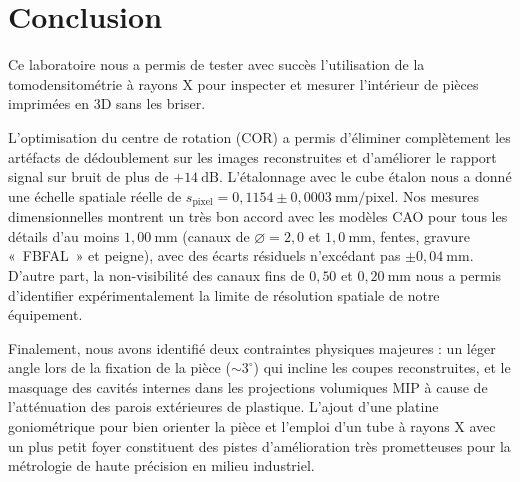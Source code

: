 \section{Conclusion}
\label{sec:conclusion}

Ce laboratoire nous a permis de tester avec succès l'utilisation de la tomodensitométrie à rayons X pour inspecter et mesurer l'intérieur de pièces imprimées en 3D sans les briser.

L'optimisation du centre de rotation (COR) a permis d'éliminer complètement les artéfacts de dédoublement sur les images reconstruites et d'améliorer le rapport signal sur bruit de plus de $+14~\text{dB}$. L'étalonnage avec le cube étalon nous a donné une échelle spatiale réelle de $s_{\text{pixel}} = 0{,}1154 \pm 0{,}0003~\text{mm/pixel}$. Nos mesures dimensionnelles montrent un très bon accord avec les modèles CAO pour tous les détails d'au moins $1{,}00~\text{mm}$ (canaux de $\varnothing = 2{,}0$ et $1{,}0~\text{mm}$, fentes, gravure «~FBFAL~» et peigne), avec des écarts résiduels n'excédant pas $\pm 0{,}04~\text{mm}$. D'autre part, la non-visibilité des canaux fins de $0{,}50$ et $0{,}20~\text{mm}$ nous a permis d'identifier expérimentalement la limite de résolution spatiale de notre équipement.

Finalement, nous avons identifié deux contraintes physiques majeures : un léger angle lors de la fixation de la pièce ($\sim 3^\circ$) qui incline les coupes reconstruites, et le masquage des cavités internes dans les projections volumiques MIP à cause de l'atténuation des parois extérieures de plastique. L'ajout d'une platine goniométrique pour bien orienter la pièce et l'emploi d'un tube à rayons X avec un plus petit foyer constituent des pistes d'amélioration très prometteuses pour la métrologie de haute précision en milieu industriel.
